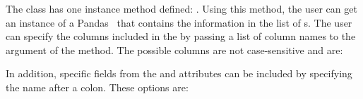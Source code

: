 \documentclass[12pt]{ussci}
\begin{document}
The  class has one instance method defined:
. Using this method, the user can get an instance of a
Pandas~\autocite{pandas}  that contains the information in the
list of s. The user can specify the columns included in the
 by passing a list of column names to the
 argument of the  method. The
possible columns are not case-sensitive and are:

\noindent\begin{itemize*}
    \item {}
    \item {}
    \item {}
    \item {}
    \item {}
    \item {}
    \item {}
    \item {}
    \item {}
    \item {}
    \item {}
\end{itemize*}

In addition, specific fields from the  and 
attributes can be included by specifying the name after a colon. These options
are:

\noindent\begin{itemize*}
    \item {}
    \item {}
    \item {}
    \item {}
    \item {}
    \item {}
    \item {}
    \item {}
\end{itemize*}

\noindent\begin{itemize*}
    \item {}
    \item {}
\end{itemize*}
\end{document}
